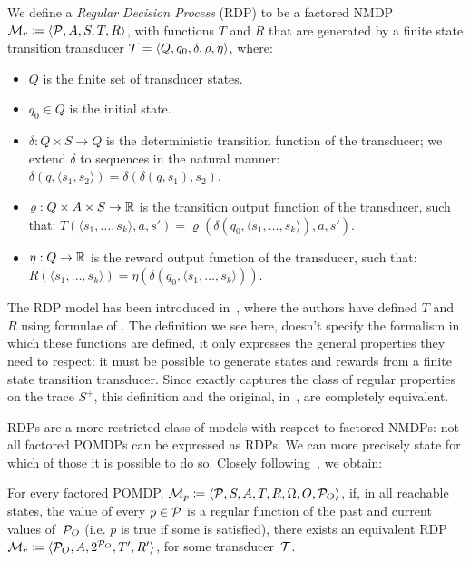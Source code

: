 \begin{definition}
	We define a \emph{Regular Decision Process}
	(RDP) to be a factored NMDP
	$\mathcal{M}_r \coloneqq \langle \mathcal{P}, A, S, T, R \rangle$, with
	functions $T$ and $R$ that are generated by a finite state transition
	transducer $\mathcal{T} = \langle Q, q_0, \delta, \varrho, \eta \rangle$,
	where:
	\begin{itemize}
		\item $Q$ is the finite set of transducer states.
		\item $q_0 \in Q$ is the initial state.
		\item $\delta: Q \times S \to Q$ is the deterministic transition function
			of the transducer; we extend $\delta$ to sequences in the natural
			manner: $\delta(q, \langle s_1, s_2 \rangle) = \delta(\delta(q, s_1),
			s_2)$.
		\item $\varrho: Q \times A \times S \to \mathbb{R}$ is the transition output
			function of the transducer, such that: $T(\langle s_1, \dots, s_k
			\rangle, a, s') = \varrho(\delta(q_0, \langle s_1, \dots, s_k \rangle),
			a, s')$.
		\item $\eta: Q \to \mathbb{R}$ is the reward output function of the transducer,
			such that: $R(\langle s_1, \dots, s_k \rangle) = \eta(\delta(q_0, \langle
			s_1, \dots, s_k \rangle))$.
	\end{itemize}
	\label{def:rdp}
\end{definition}
The RDP model has been introduced in~\cite{bib:rdp}, where the authors have
defined $T$ and $R$ using formulae of \ldl{}. The definition we see here,
doesn't specify the formalism in which these functions are defined, it only
expresses the general properties they need to respect: it must be possible to
generate states and rewards from a finite state transition transducer. Since
\ldl{} exactly captures the class of regular properties on the trace $S^+$,
this definition and the original, in~\cite{bib:rdp}, are completely
equivalent.

RDPs are a more restricted class of models with respect to factored NMDPs:
not all factored POMDPs can be expressed as RDPs. We can more precisely state
for which of those it is possible to do so. Closely following~\cite{bib:rdp},
we obtain:
\begin{theorem}
	For every factored POMDP, $\mathcal{M}_p \coloneqq \langle
	\mathcal{P}, S, A, T, R, \Omega, O, \mathcal{P}_O \rangle$, if, in all
	reachable states, the value of every $p \in \mathcal{P}$ is a regular
	function of the past and current values of~$\mathcal{P}_O$ (i.e. $p$ is true
	if some \re{} is satisfied), there exists an equivalent RDP $\mathcal{M}_r
	\coloneqq \langle \mathcal{P}_O, A, 2^{\mathcal{P}_O}, T', R' \rangle$, for
	some transducer~$\mathcal{T}$.
	\label{th:pomdp-rdp}
\end{theorem}

